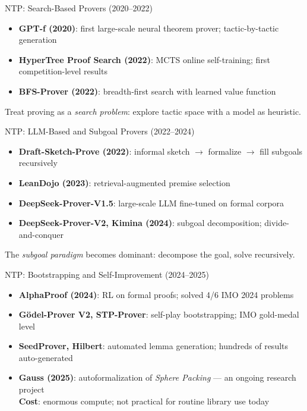 \documentclass{beamer}
\newcommand{\bad}[1]{\textcolor{improverRed}{\textbf{#1}}}
\begin{document}
\begin{frame}{NTP: Search-Based Provers (2020--2022)}
\vspace{0.6em}
\begin{itemize}\setlength{\itemsep}{10pt}
  \item \textbf{GPT-f (2020)}: first large-scale neural theorem prover; tactic-by-tactic generation
  \item \textbf{HyperTree Proof Search (2022)}: MCTS online self-training; first competition-level results
  \item \textbf{BFS-Prover (2022)}: breadth-first search with learned value function
\end{itemize}
\vspace{0.8em}
\begin{block}{}
  Treat proving as a \emph{search problem}: explore tactic space with a model as heuristic.
\end{block}
\end{frame}

\begin{frame}{NTP: LLM-Based and Subgoal Provers (2022--2024)}
\vspace{0.6em}
\begin{itemize}\setlength{\itemsep}{10pt}
  \item \textbf{Draft-Sketch-Prove (2022)}: informal sketch $\to$ formalize $\to$ fill subgoals recursively
  \item \textbf{LeanDojo (2023)}: retrieval-augmented premise selection
  \item \textbf{DeepSeek-Prover-V1.5}: large-scale LLM fine-tuned on formal corpora
  \item \textbf{DeepSeek-Prover-V2, Kimina (2024)}: subgoal decomposition; divide-and-conquer
\end{itemize}
\vspace{0.6em}
\begin{block}{}
  The \emph{subgoal paradigm} becomes dominant: decompose the goal, solve recursively.
\end{block}
\end{frame}

\begin{frame}{NTP: Bootstrapping and Self-Improvement (2024--2025)}
\vspace{0.6em}
\begin{itemize}\setlength{\itemsep}{10pt}
  \item \textbf{AlphaProof (2024)}: RL on formal proofs; solved 4/6 IMO 2024 problems
  \item \textbf{Gödel-Prover V2, STP-Prover}: self-play bootstrapping; IMO gold-medal level
  \item \textbf{SeedProver, Hilbert}: automated lemma generation; hundreds of results auto-generated
  \item \textbf{Gauss (2025)}: autoformalization of \emph{Sphere Packing} --- an ongoing research project\\
    \small \bad{Cost}: enormous compute; not practical for routine library use today
\end{itemize}
\end{frame}
\end{document}
